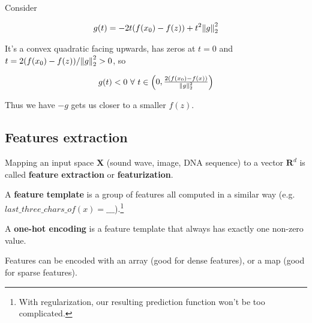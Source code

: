 \documentclass{article}
\begin{document}
Consider

$$
g(t) = - 2 t (f(x_0) - f(z)) + t^2 \norm{g}_2^2
$$

It's a convex quadratic facing upwards, has zeros at $t = 0$ and $t = 2 (f(x_0) - f(z)) / \norm{g}_2^2 > 0$, so

$$
g(t) < 0 ~\forall ~ t \in \begin{pmatrix} 0, \frac{2 (f(x_0) - f(x))}{\norm{g}_2^2} \end{pmatrix}
$$

Thus we have $-g$ gets us closer to a smaller $f(z)$.

\subsection{Features extraction}

Mapping an input space $\mathbf{X}$ (sound wave, image, DNA sequence) to a vector $\mathbf{R}^d$ is called \textbf{feature extraction} or \textbf{featurization}.

A \textbf{feature template} is a group of features all computed in a similar way (e.g. $last\_three\_chars\_of(x) = \_\_\_$).\footnote{With regularization, our resulting prediction function won't be too complicated.}

A \textbf{one-hot encoding} is a feature template that always has exactly one non-zero value.

Features can be encoded with an array (good for dense features), or a map (good for sparse features).
\end{document}

